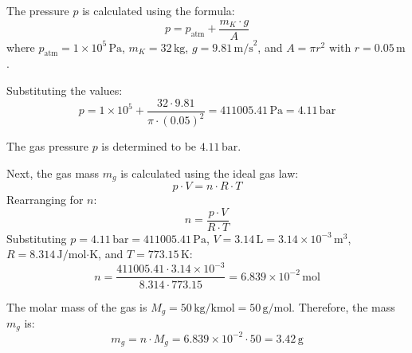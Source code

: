 The pressure \( p \) is calculated using the formula:  
\[
p = p_{\text{atm}} + \frac{m_K \cdot g}{A}
\]  
where \( p_{\text{atm}} = 1 \times 10^5 \, \text{Pa} \), \( m_K = 32 \, \text{kg} \), \( g = 9.81 \, \text{m/s}^2 \), and \( A = \pi r^2 \) with \( r = 0.05 \, \text{m} \).  

Substituting the values:  
\[
p = 1 \times 10^5 + \frac{32 \cdot 9.81}{\pi \cdot (0.05)^2} = 411005.41 \, \text{Pa} = 4.11 \, \text{bar}
\]  

The gas pressure \( p \) is determined to be \( 4.11 \, \text{bar} \).  

Next, the gas mass \( m_g \) is calculated using the ideal gas law:  
\[
p \cdot V = n \cdot R \cdot T
\]  
Rearranging for \( n \):  
\[
n = \frac{p \cdot V}{R \cdot T}
\]  
Substituting \( p = 4.11 \, \text{bar} = 411005.41 \, \text{Pa} \), \( V = 3.14 \, \text{L} = 3.14 \times 10^{-3} \, \text{m}^3 \), \( R = 8.314 \, \text{J/mol·K} \), and \( T = 773.15 \, \text{K} \):  
\[
n = \frac{411005.41 \cdot 3.14 \times 10^{-3}}{8.314 \cdot 773.15} = 6.839 \times 10^{-2} \, \text{mol}
\]  

The molar mass of the gas is \( M_g = 50 \, \text{kg/kmol} = 50 \, \text{g/mol} \). Therefore, the mass \( m_g \) is:  
\[
m_g = n \cdot M_g = 6.839 \times 10^{-2} \cdot 50 = 3.42 \, \text{g}
\]